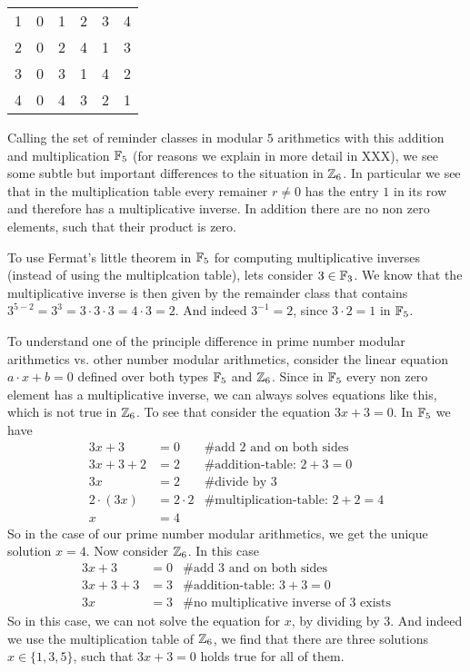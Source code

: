 \begin{example} 
\begin{center}
\begin{tabular}{c | c c c c c}
      1 & 0 & 1 & 2 & 3 & 4 \\
      2 & 0 & 2 & 4 & 1 & 3 \\
      3 & 0 & 3 & 1 & 4 & 2 \\
      4 & 0 & 4 & 3 & 2 & 1 \\
  \end{tabular}
\end{center}
Calling the set of reminder classes in modular $5$ arithmetics with this addition and multiplication $\mathbb{F}_5$ (for reasons we explain in more detail in XXX), we see some subtle but important differences to the situation in $\mathbb{Z}_6$. In particular we see that in the multiplication table every remainer $r\neq 0$ has the entry $1$ in its row and therefore has a multiplicative inverse. In addition there are no non zero elements, such that their product is zero.

To use Fermat's little theorem in $\mathbb{F}_5$ for computing multiplicative inverses (instead of using the multiplcation table), lets consider $3\in\mathbb{F}_3$. We know that the multiplicative inverse is then given by the remainder class that contains $3^{5-2}=3^3=3\cdot 3\cdot 3= 4\cdot 3 = 2$. And indeed $3^{-1}=2$, since $3\cdot 2 =1$ in $\mathbb{F}_5$.
\end{example}
\begin{example}
To understand one of the principle difference in prime number modular arithmetics vs. other number modular arithmetics, consider the linear equation $a\cdot x +b=0$ defined over both types $\mathbb{F}_5$ and $\mathbb{Z}_6$. Since in $\mathbb{F}_5$ every non zero element has a multiplicative inverse, we can always solves equations like this, which is not true in $\mathbb{Z}_6$. To see that consider the equation $3x+3=0$. In $\mathbb{F}_5$ we have
\begin{align*}
3x+3    &= 0 & \text{\# add 2 and on both sides} \\
3x+3+2  &= 2 & \text{\# addition-table: } 2+3 = 0 \\
3x      &= 2 & \text{\# divide by } 3 \\
2\cdot(3x)      &= 2\cdot 2 & \text{\# multiplication-table: } 2+2=4 \\
 x      &= 4 & 
\end{align*}
So in the case of our prime number modular arithmetics, we get the unique solution $x=4$. Now consider $\mathbb{Z}_6$. In this case 
\begin{align*}
3x+3    &= 0 & \text{\# add 3 and on both sides} \\
3x+3+3  &= 3 & \text{\# addition-table: } 3+3 = 0 \\
3x      &= 3 & \text{\# no multiplicative inverse of 3  exists}
\end{align*}
So in this case, we can not solve the equation for $x$, by dividing by $3$. And indeed we use the multiplication table of $\mathbb{Z}_6$, we find that there are three solutions $x\in\{1,3,5\}$, such that $3x+3=0$ holds true for all of them.
\end{example}
